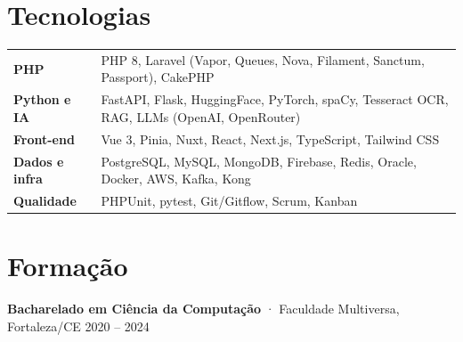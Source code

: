 \documentclass[10pt,a4paper]{article}
\begin{document}
\section{Tecnologias}
\begin{tabularx}{\linewidth}{@{}l X@{}}
\textbf{PHP} & PHP 8, Laravel (Vapor, Queues, Nova, Filament, Sanctum, Passport), CakePHP \\
\textbf{Python e IA} & FastAPI, Flask, HuggingFace, PyTorch, spaCy, Tesseract OCR, RAG, LLMs (OpenAI, OpenRouter) \\
\textbf{Front-end} & Vue 3, Pinia, Nuxt, React, Next.js, TypeScript, Tailwind CSS \\
\textbf{Dados e infra} & PostgreSQL, MySQL, MongoDB, Firebase, Redis, Oracle, Docker, AWS, Kafka, Kong \\
\textbf{Qualidade} & PHPUnit, pytest, Git/Gitflow, Scrum, Kanban \\
\end{tabularx}

\section{Formação}
\textbf{Bacharelado em Ciência da Computação} · Faculdade Multiversa, Fortaleza/CE \hfill {\color{muted}\small 2020 – 2024}
\end{document}
